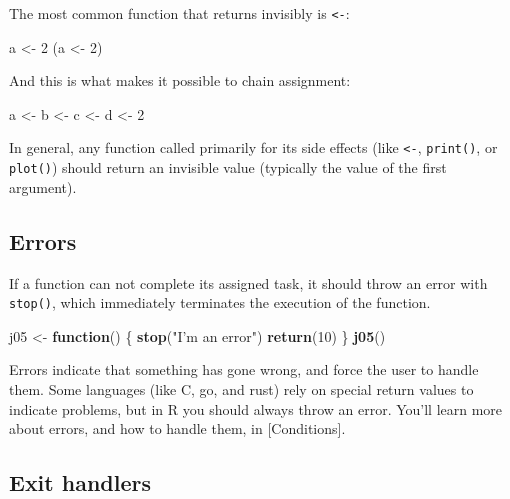 \documentclass[]{book}
\newenvironment{Shaded}{\begin{snugshade}}{\end{snugshade}}
\newcommand{\KeywordTok}[1]{\textcolor[rgb]{0.13,0.29,0.53}{\textbf{#1}}}
\newcommand{\DecValTok}[1]{\textcolor[rgb]{0.00,0.00,0.81}{#1}}
\newcommand{\StringTok}[1]{\textcolor[rgb]{0.31,0.60,0.02}{#1}}
\newcommand{\ControlFlowTok}[1]{\textcolor[rgb]{0.13,0.29,0.53}{\textbf{#1}}}
\newcommand{\NormalTok}[1]{#1}
\theoremstyle{definition}
\theoremstyle{definition}
\theoremstyle{definition}
\theoremstyle{remark}
\begin{document}
The most common function that returns invisibly is
\texttt{\textless{}-}:

\begin{Shaded}
\begin{Highlighting}[]
\NormalTok{a <-}\StringTok{ }\DecValTok{2}
\NormalTok{(a <-}\StringTok{ }\DecValTok{2}\NormalTok{)}
\end{Highlighting}
\end{Shaded}

And this is what makes it possible to chain assignment:

\begin{Shaded}
\begin{Highlighting}[]
\NormalTok{a <-}\StringTok{ }\NormalTok{b <-}\StringTok{ }\NormalTok{c <-}\StringTok{ }\NormalTok{d <-}\StringTok{ }\DecValTok{2}
\end{Highlighting}
\end{Shaded}

In general, any function called primarily for its side effects (like
\texttt{\textless{}-}, \texttt{print()}, or \texttt{plot()}) should
return an invisible value (typically the value of the first argument).

\subsection{Errors}\label{errors}

If a function can not complete its assigned task, it should throw an
error with \texttt{stop()}, which immediately terminates the execution
of the function.

\begin{Shaded}
\begin{Highlighting}[]
\NormalTok{j05 <-}\StringTok{ }\ControlFlowTok{function}\NormalTok{() \{}
  \KeywordTok{stop}\NormalTok{(}\StringTok{"I'm an error"}\NormalTok{)}
  \KeywordTok{return}\NormalTok{(}\DecValTok{10}\NormalTok{)}
\NormalTok{\}}
\KeywordTok{j05}\NormalTok{()}
\end{Highlighting}
\end{Shaded}

Errors indicate that something has gone wrong, and force the user to
handle them. Some languages (like C, go, and rust) rely on special
return values to indicate problems, but in R you should always throw an
error. You'll learn more about errors, and how to handle them, in
{[}Conditions{]}.

\hypertarget{on-exit}{\subsection{Exit handlers}\label{on-exit}}
\end{document}
